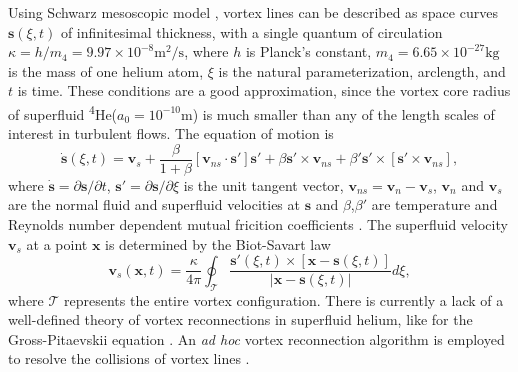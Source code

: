 \documentclass[%
superscriptaddress,
 amsmath,amssymb,
prl,
prb,
]{revtex4-2}
\def \s{\mathbf{s}}
\def \v{\mathbf{v}}
\def \x{\mathbf{x}}
\begin{document}
Using Schwarz mesoscopic model \cite{schwarzThreedimensionalVortexDynamics1988a}, vortex lines can be described as space curves $\s(\xi,t)$ of infinitesimal thickness, with a single quantum of circulation $\kappa=h/m_4=9.97\times10^{-8}\text{m}^2/\text{s}$, where $h$ is Planck's constant, $m_4=6.65\times10^{-27}\text{kg}$ is the mass of one helium atom, $\xi$ is the natural parameterization, arclength, and $t$ is time. These conditions are a good approximation, since the vortex core radius of superfluid \textsuperscript{4}He($a_0=10^{-10}\text{m}$) is much smaller than any of the length scales of interest in turbulent flows. The equation of motion is
\begin{equation}
	\dot{\s}(\xi,t) = \v_s + \frac{\beta}{1+\beta}\left[\v_{ns}\cdot \s'\right]\s' + \beta\s'\times\v_{ns}+\beta'\s'\times\left[\s'\times \v_{ns}\right],
\end{equation}
where $\dot{\s}=\partial\s/\partial t$, $\s'=\partial\s/\partial \xi$ is the unit tangent vector, $\v_{ns}=\v_n - \v_s$, $\v_n$ and $\v_s$ are the normal fluid and superfluid velocities at $\s$ and $\beta$,$\beta'$ are temperature and Reynolds number dependent mutual fricition coefficients \cite{galantucciNewSelfconsistentApproach2020b}. The superfluid velocity $\v_s$ at a point $\x$ is determined by the Biot-Savart law
\begin{equation}
	\v_s(\x,t) = \frac{\kappa}{4\pi}\oint_{\mathcal{T}}\frac{\s'(\xi,t)\times\left[\x-\s(\xi,t)\right]}{|\x-\s(\xi,t)|}d\xi,
\end{equation}
where $\mathcal{T}$ represents the entire vortex configuration.
There is currently a lack of a well-defined theory of vortex reconnections in superfluid helium, like for the Gross-Pitaevskii equation \cite{villoisIrreversibleDynamicsVortex2020,villoisUniversalNonuniversalAspects2017a,promentMatchingTheoryCharacterize2020a}. An \emph{ad hoc} vortex reconnection algorithm is employed to resolve the collisions of vortex lines \cite{baggaleySensitivityVortexFilament2012a}.
\end{document}
